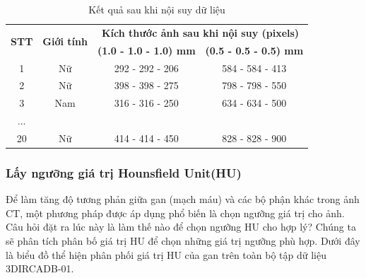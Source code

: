 \begin{table}[H]
    \centering
    \begin{tabular}{|c|c|c|c|}
    \hline
    \multirow{2}{*}{\textbf{STT}} & \multirow{2}{*}{\textbf{Giới tính}} & \multicolumn{2}{c|}{\textbf{Kích thước ảnh sau khi nội suy (pixels)}}  \\ \cline{3-4}
     &  & \textbf{(1.0 - 1.0 - 1.0) mm} & \textbf{(0.5 - 0.5 - 0.5) mm} \\ \hline
    1   & Nữ  & 292 - 292 - 206  & 584 - 584 - 413 \\ \hline
    2   & Nữ  & 398 - 398 - 275 & 798 - 798 - 550 \\ \hline
    3   & Nam & 316 - 316 - 250 & 634 - 634 - 500 \\ \hline
    ... &     &                 &                 \\ \hline
    20  & Nữ  & 414 - 414 - 450 & 828 - 828 - 900 \\ \hline
    \end{tabular}
    \caption{Kết quả sau khi nội suy dữ liệu}
\end{table}

\subsubsection{Lấy ngưỡng giá trị Hounsfield Unit(HU)}
Để làm tăng độ tương phản giữa gan (mạch máu) và các bộ phận khác trong ảnh CT, một phương pháp được áp dụng phổ biến là chọn ngưỡng giá trị cho ảnh. Câu hỏi đặt ra lúc này là làm thế nào để chọn ngưỡng HU cho hợp lý? Chúng ta sẽ phân tích phân bố giá trị HU để chọn những giá trị ngưỡng phù hợp. Dưới đây là biểu đồ thể hiện phân phối giá trị HU của gan trên toàn bộ tập dữ liệu 3DIRCADB-01.

